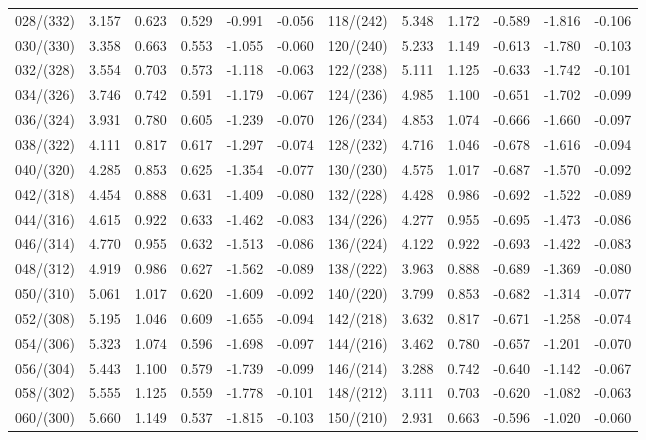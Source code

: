 \begin{table}
{\begin{tabular}{crrrrr|crrrrr}
028/(332) &  3.157 &  0.623 &  0.529 & -0.991 & -0.056 & 118/(242) &  5.348 &  1.172 & -0.589 & -1.816 & -0.106\\
030/(330) &  3.358 &  0.663 &  0.553 & -1.055 & -0.060 & 120/(240) &  5.233 &  1.149 & -0.613 & -1.780 & -0.103\\
032/(328) &  3.554 &  0.703 &  0.573 & -1.118 & -0.063 & 122/(238) &  5.111 &  1.125 & -0.633 & -1.742 & -0.101\\
034/(326) &  3.746 &  0.742 &  0.591 & -1.179 & -0.067 & 124/(236) &  4.985 &  1.100 & -0.651 & -1.702 & -0.099\\
036/(324) &  3.931 &  0.780 &  0.605 & -1.239 & -0.070 & 126/(234) &  4.853 &  1.074 & -0.666 & -1.660 & -0.097\\
038/(322) &  4.111 &  0.817 &  0.617 & -1.297 & -0.074 & 128/(232) &  4.716 &  1.046 & -0.678 & -1.616 & -0.094\\
040/(320) &  4.285 &  0.853 &  0.625 & -1.354 & -0.077 & 130/(230) &  4.575 &  1.017 & -0.687 & -1.570 & -0.092\\
042/(318) &  4.454 &  0.888 &  0.631 & -1.409 & -0.080 & 132/(228) &  4.428 &  0.986 & -0.692 & -1.522 & -0.089\\
044/(316) &  4.615 &  0.922 &  0.633 & -1.462 & -0.083 & 134/(226) &  4.277 &  0.955 & -0.695 & -1.473 & -0.086\\
046/(314) &  4.770 &  0.955 &  0.632 & -1.513 & -0.086 & 136/(224) &  4.122 &  0.922 & -0.693 & -1.422 & -0.083\\
048/(312) &  4.919 &  0.986 &  0.627 & -1.562 & -0.089 & 138/(222) &  3.963 &  0.888 & -0.689 & -1.369 & -0.080\\
050/(310) &  5.061 &  1.017 &  0.620 & -1.609 & -0.092 & 140/(220) &  3.799 &  0.853 & -0.682 & -1.314 & -0.077\\
052/(308) &  5.195 &  1.046 &  0.609 & -1.655 & -0.094 & 142/(218) &  3.632 &  0.817 & -0.671 & -1.258 & -0.074\\
054/(306) &  5.323 &  1.074 &  0.596 & -1.698 & -0.097 & 144/(216) &  3.462 &  0.780 & -0.657 & -1.201 & -0.070\\
056/(304) &  5.443 &  1.100 &  0.579 & -1.739 & -0.099 & 146/(214) &  3.288 &  0.742 & -0.640 & -1.142 & -0.067\\
058/(302) &  5.555 &  1.125 &  0.559 & -1.778 & -0.101 & 148/(212) &  3.111 &  0.703 & -0.620 & -1.082 & -0.063\\
060/(300) &  5.660 &  1.149 &  0.537 & -1.815 & -0.103 & 150/(210) &  2.931 &  0.663 & -0.596 & -1.020 & -0.060\\

\end{tabular}}
\end{table}
